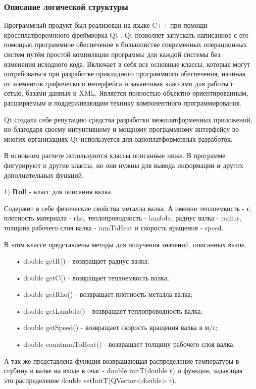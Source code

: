 \subsubsection{Описание логической структуры}

Программный продукт был реализован на языке C++ при помощи кроссплатфоремнного фреймворка Qt \cite{QT}. Qt позволяет запускать написанное с его помощью программное обеспечение в большинстве современных операционных систем путём простой компиляции программы для каждой системы без изменения исходного кода. Включает в себя все основные классы, которые могут потребоваться при разработке прикладного программного обеспечения, начиная от элементов графического интерфейса и заканчивая классами для работы с сетью, базами данных и XML. Является полностью объектно-ориентированным, расширяемым и поддерживающим технику компонентного программирования.

Qt создала себе репутацию средства разработки межплатформенных приложений, но благодаря своему интуитивному и мощному программному интерфейсу во многих организациях Qt используется для одноплатформенных разработок.

В основном расчете используются классы описанные ниже. В программе фигурируют и другие классы, но они нужны для вывода информации и других дополнительных функций.

1) \textbf{Roll} - класс для описания валка.

Содержит в себе физические свойства металла валка. А именно теплоемкость - с, плотность материала - rho, теплопроводность - lambda, радиус валка - radius,  толщина рабочего слоя валка - mmToHeat и скорость вращения - speed.

В этом классе представлены методы для получения значений, описанных выше.
\begin{itemize}
\item[•] double getR() - возвращает радиус валка;
\item[•] double getC() - возвращает теплоемкость валка;
\item[•] double getRho() - возвращает плотность металла валка;
\item[•] double getLambda() - возвращает теплопроводность валка;
\item[•] double getSpeed() - возвращает скорость вращения валка в м/с;
\item[•] double countmmToHeat() - возвращает толщину рабочего слоя валка.
\end{itemize}

А так же представлена функция возвращающая распределение температуры в глубину в валке на входе в очаг - double initT(double r) и функция, задающая это распределение double setInitT(QVector<double> t).

